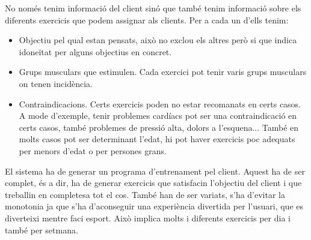 No només tenim informació del client sinó que també tenim informació sobre els diferents exercicis que podem assignar als clients. Per a cada un d'ells tenim:

\begin{itemize}
    \item Objectiu pel qual estan pensats, això no exclou els altres però si que indica idoneïtat per alguns objectius en concret.
    \item Grups musculars que estimulen. Cada exercici pot tenir varis grups musculars on tenen incidència.
    \item Contraindicacions. Certs exercicis poden no estar recomanats en certs casos. A mode d'exemple, tenir problemes cardíacs pot ser una contraindicació en certs casos, també problemes de pressió alta, dolors a l'esquena... També en molts casos pot ser determinant l'edat, hi pot haver exercicis poc adequats per menors d'edat o per persones grans.
    
\end{itemize}

El sistema ha de generar un programa d'entrenament pel client.
Aquest ha de ser complet, és a dir, ha de generar exercicis que satisfacin l'objectiu del client i que treballin en completesa tot el cos. 
També han de ser variats, s'ha d'evitar la monotonia ja que s'ha d'aconseguir una experiència divertida per l'usuari, que es diverteixi mentre faci esport. 
Això implica molts i diferents exercicis per dia i també per setmana.

